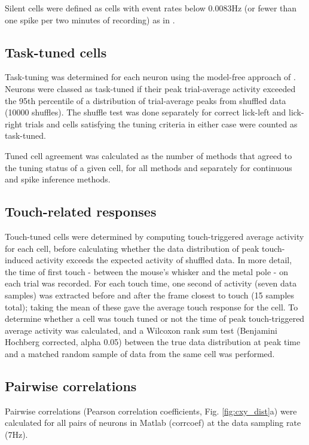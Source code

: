 \documentclass[a4paper,11pt]{article}
\begin{document}
Silent cells were defined as cells with event rates below 0.0083Hz (or fewer than one spike per two minutes of recording) as in \cite{OConnor2010-hd}.

\subsection{Task-tuned cells}
Task-tuning was determined for each neuron using the model-free approach of \cite{Peron2015-kd}. Neurons were classed as task-tuned if their peak trial-average activity exceeded the 95th percentile of a distribution of trial-average peaks from shuffled data (10000 shuffles). The shuffle test was done separately for correct lick-left and lick-right trials and cells satisfying the tuning criteria in either case were counted as task-tuned.

Tuned cell agreement was calculated as the number of methods that agreed to the tuning status of a given cell, for all methods and separately for continuous and spike inference methods.

\subsection{Touch-related responses}
Touch-tuned cells were determined by computing touch-triggered average activity for each cell, before calculating whether the data distribution of peak touch-induced activity exceeds the expected activity of shuffled data. In more detail, the time of first touch - between the mouse's whisker and the metal pole - on each trial was recorded. For each touch time, one second of activity (seven data samples) was extracted before and after the frame closest to touch (15 samples total); taking the mean of these gave the average touch response for the cell. To determine whether a cell was touch tuned or not the time of peak touch-triggered average activity was calculated, and a Wilcoxon rank sum test (Benjamini Hochberg corrected, alpha 0.05) between the true data distribution at peak time and a matched random sample of data from the same cell was performed.

\subsection{Pairwise correlations}
Pairwise correlations (Pearson correlation coefficients, Fig. \ref{fig:cxy_dist}a) were calculated for all pairs of neurons in Matlab (corrcoef) at the data sampling rate (7Hz). 
\end{document}
